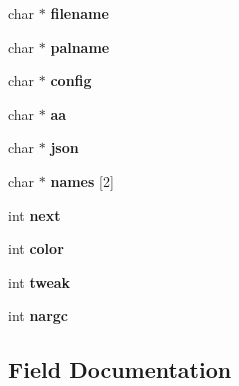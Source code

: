 \begin{DoxyCompactItemize}
\item 
\mbox{\label{struct_parameters_a23b676a85d6a74715ebf52d083b26d41}} 
char $\ast$ {\bfseries filename}
\item 
\mbox{\label{struct_parameters_af435d3291ff1a66552d9f3383c6a517c}} 
char $\ast$ {\bfseries palname}
\item 
\mbox{\label{struct_parameters_ab3ec51653a2131c0a7049e0a5e34e651}} 
char $\ast$ {\bfseries config}
\item 
\mbox{\label{struct_parameters_a37a1880a2aa4730679fc51040af3a976}} 
char $\ast$ {\bfseries aa}
\item 
\mbox{\label{struct_parameters_ae19686186ca51dd3c4bdd868e52dc04d}} 
char $\ast$ {\bfseries json}
\item 
\mbox{\label{struct_parameters_aa6e175e74be18fd5d3ed7c3cbece5adb}} 
char $\ast$ {\bfseries names} \mbox{[}2\mbox{]}
\item 
\mbox{\label{struct_parameters_a48e77fdf8acb086d2fdc2934ca2d10d3}} 
int {\bfseries next}
\item 
\mbox{\label{struct_parameters_a0ec9c97da0f7373e9c2b4f898ff76e46}} 
int {\bfseries color}
\item 
\mbox{\label{struct_parameters_a1962cf70d9f60c9b1b6d567a0152776b}} 
int {\bfseries tweak}
\item 
\mbox{\label{struct_parameters_af32c7cefa9c4b491b98c6d13fbc3023d}} 
int {\bfseries nargc}
\end{DoxyCompactItemize}


\subsection{Field Documentation}
\mbox{\label{struct_parameters_a37a1880a2aa4730679fc51040af3a976}} 
